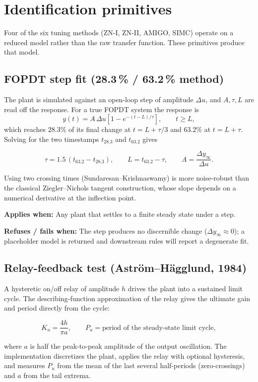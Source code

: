 \documentclass[11pt]{article}
\newcommand{\keybox}[1]{%
  \par\vspace{0.4em}%
  \noindent\colorbox{boxbg}{%
    \begin{minipage}{\dimexpr\linewidth-2\fboxsep\relax}%
      \vspace{0.3em}#1\vspace{0.3em}%
    \end{minipage}}%
  \par\vspace{0.4em}%
}
\newcommand{\applies}[1]{\smallskip\noindent\textbf{Applies when:} #1\par}
\newcommand{\refuses}[1]{\noindent\textbf{Refuses / fails when:} #1\par}
\begin{document}
\section{Identification primitives}

Four of the six tuning methods (ZN-I, ZN-II, AMIGO, SIMC) operate on a
reduced model rather than the raw transfer function. These primitives produce
that model.

\subsection{FOPDT step fit (28.3\,\% / 63.2\,\% method)}

The plant is simulated against an open-loop step of amplitude $\Delta u$, and
$A,\tau,L$ are read off the response. For a true FOPDT system the response is
\[
  y(t) = A\,\Delta u\left[1 - e^{-(t-L)/\tau}\right], \qquad t \ge L,
\]
which reaches $28.3\%$ of its final change at $t = L + \tau/3$ and $63.2\%$ at
$t = L + \tau$. Solving for the two timestamps $t_{28.3}$ and $t_{63.2}$ gives
\keybox{\[
  \tau = 1.5\,(t_{63.2} - t_{28.3}), \qquad
  L = t_{63.2} - \tau, \qquad
  A = \frac{\Delta y_{\infty}}{\Delta u}.
\]}
Using two crossing times (Sundaresan--Krishnaswamy) is more noise-robust than
the classical Ziegler--Nichols tangent construction, whose slope depends on a
numerical derivative at the inflection point.

\applies{Any plant that settles to a finite steady state under a step.}
\refuses{The step produces no discernible change ($\Delta y_\infty \approx 0$);
a placeholder model is returned and downstream rules will report a degenerate
fit.}

\subsection{Relay-feedback test (Aström--Hägglund, 1984)}

A hysteretic on/off relay of amplitude $h$ drives the plant into a sustained
limit cycle. The describing-function approximation of the relay gives the
ultimate gain and period directly from the cycle:
\keybox{\[
  K_u = \frac{4h}{\pi a}, \qquad
  P_u = \text{period of the steady-state limit cycle},
\]}
where $a$ is half the peak-to-peak amplitude of the output oscillation. The
implementation discretizes the plant, applies the relay with optional
hysteresis, and measures $P_u$ from the mean of the last several half-periods
(zero-crossings) and $a$ from the tail extrema.
\end{document}
